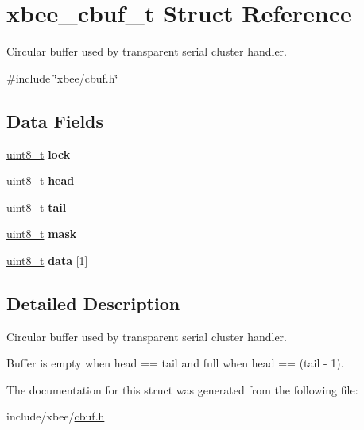 \hypertarget{structxbee__cbuf__t}{\section{xbee\-\_\-cbuf\-\_\-t Struct Reference}
\label{structxbee__cbuf__t}
}


Circular buffer used by transparent serial cluster handler.  




{\ttfamily \#include \char`\"{}xbee/cbuf.\-h\char`\"{}}

\subsection*{Data Fields}
\begin{DoxyCompactItemize}
\item 
\hypertarget{group__util__cbuf_ga92435efb84d6814afd444fd462802e9c}{\hyperlink{group__hal_gae1affc9ca37cfb624959c866a73f83c2}{uint8\-\_\-t} {\bfseries lock}}\label{group__util__cbuf_ga92435efb84d6814afd444fd462802e9c}

\item 
\hypertarget{group__util__cbuf_ga9794c0e61506b826b49b458708ae2489}{\hyperlink{group__hal_gae1affc9ca37cfb624959c866a73f83c2}{uint8\-\_\-t} {\bfseries head}}\label{group__util__cbuf_ga9794c0e61506b826b49b458708ae2489}

\item 
\hypertarget{group__util__cbuf_ga8db7f977b77e4e4d588ef0d3e04ada16}{\hyperlink{group__hal_gae1affc9ca37cfb624959c866a73f83c2}{uint8\-\_\-t} {\bfseries tail}}\label{group__util__cbuf_ga8db7f977b77e4e4d588ef0d3e04ada16}

\item 
\hypertarget{group__util__cbuf_ga8a74907784be6c7786c2d060c8d7e10b}{\hyperlink{group__hal_gae1affc9ca37cfb624959c866a73f83c2}{uint8\-\_\-t} {\bfseries mask}}\label{group__util__cbuf_ga8a74907784be6c7786c2d060c8d7e10b}

\item 
\hypertarget{group__util__cbuf_gaa86e1085c6a16f60258f29c9d5fc2144}{\hyperlink{group__hal_gae1affc9ca37cfb624959c866a73f83c2}{uint8\-\_\-t} {\bfseries data} \mbox{[}1\mbox{]}}\label{group__util__cbuf_gaa86e1085c6a16f60258f29c9d5fc2144}

\end{DoxyCompactItemize}


\subsection{Detailed Description}
Circular buffer used by transparent serial cluster handler. 

Buffer is empty when {\ttfamily head} == {\ttfamily tail} and full when {\ttfamily head} == {\ttfamily }(tail -\/ 1). 

The documentation for this struct was generated from the following file\-:\begin{DoxyCompactItemize}
\item 
include/xbee/\hyperlink{cbuf_8h}{cbuf.\-h}\end{DoxyCompactItemize}
